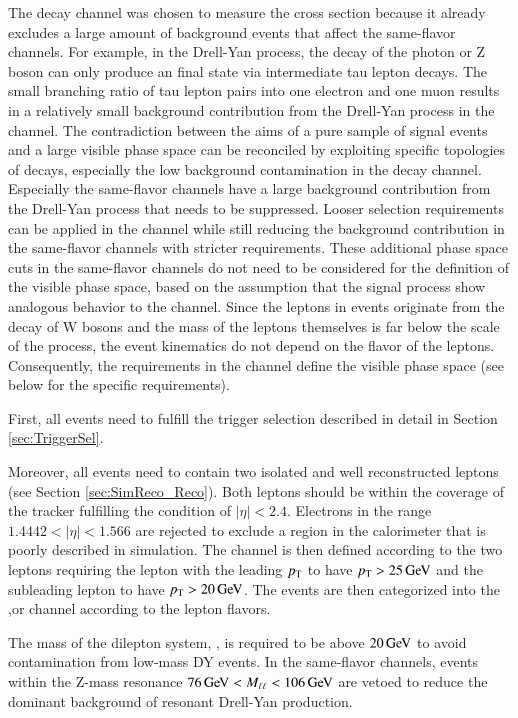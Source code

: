 The \emu decay channel was chosen to measure the \ttbar cross section because it already excludes a large amount of background events that affect the same-flavor channels.
For example, in the Drell-Yan process, the decay of the photon or Z boson can only produce an \emu final state via intermediate tau lepton decays. The small branching ratio of tau lepton pairs into one electron and one muon results
in a relatively small background contribution from the Drell-Yan process in the \emu channel.
The contradiction between the aims of a pure sample of signal events and a large visible phase space can be reconciled by exploiting specific topologies of \ttbar decays, especially the low background contamination in the \emu decay channel. Especially the same-flavor channels have a large background contribution from the Drell-Yan process that needs to be suppressed.
Looser selection requirements can be applied in the \emu channel while still reducing the background contribution in the same-flavor channels with stricter requirements.
These additional phase space cuts in the same-flavor channels do not need to be considered for the definition of the visible phase space, based on the assumption that the \ttbar signal process show analogous behavior to the \emu channel. Since the leptons in \ttbar events originate from the decay of W bosons and the
mass of the leptons themselves is far below the scale of the process, the event kinematics do not depend on the flavor of the leptons.
Consequently, the requirements in the \emu channel define the visible phase space (see below for the specific requirements).

First, all events need to fulfill the trigger selection described in detail in Section \ref{sec:TriggerSel}.

Moreover, all events need to contain two isolated and well reconstructed leptons (see Section \ref{sec:SimReco_Reco}).
Both leptons should be within the coverage of the tracker fulfilling the condition of $|\eta| < 2.4$.
Electrons in the range $1.4442<|\eta|<1.566$ are rejected to exclude a region in the calorimeter that is poorly described in simulation.
The channel is then defined according to the two leptons requiring the lepton with the leading $p_{\mathrm{T}}$ to have $p_{\mathrm{T}} > 25 \,\text{Ge\hspace{-.08em}V}$
and the subleading lepton to have $p_{\mathrm{T}} > 20 \,\text{Ge\hspace{-.08em}V}$. 
The events are then categorized into the \mumu,\ee or \mumu channel according to the lepton flavors.

The mass of the dilepton system, \mll, is required to be above $ 20 \,\text{Ge\hspace{-.08em}V}$ to avoid contamination from low-mass DY events.
In the same-flavor channels, events within the Z-mass resonance $76 \,\text{Ge\hspace{-.08em}V} < M_{\ell\ell} <106 \,\text{Ge\hspace{-.08em}V}$ are vetoed to reduce the dominant background of 
resonant Drell-Yan production.


